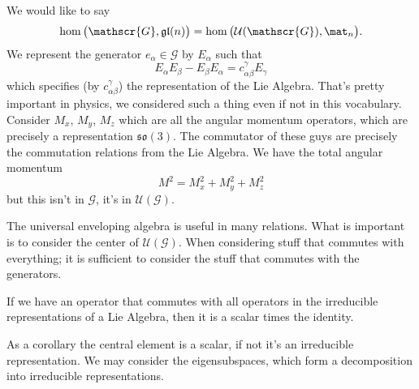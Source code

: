 We would like to say
\begin{equation}
\hom\big(\mathscr{G},\mathfrak{gl}(n)\big)=\hom\big(\mathcal{U}(\mathscr{G}),\mat_{n}\big).
\end{equation}
We represent the generator $e_{\alpha}\in\mathscr{G}$ by
$E_{\alpha}$ such that
\begin{equation}
E_{\alpha}E_{\beta}-E_{\beta}E_{\alpha}=c^{\gamma}_{\alpha\beta}E_{\gamma}
\end{equation}
which specifies (by $c^{\gamma}_{\alpha\beta}$) the
representation of the Lie Algebra. That's pretty important in
physics, we considered such a thing even if not in this
vocabulary. Consider $M_{x}$, $M_{y}$, $M_{z}$ which are all the
angular momentum operators, which are precisely a representation
$\mathfrak{so}(3)$. The commutator of these guys are precisely
the commutation relations from the Lie Algebra. We have the total
angular momentum
\begin{equation}
M^{2}=M_{x}^{2}+M_{y}^{2}+M_{z}^{2}
\end{equation}
but this isn't in $\mathscr{G}$, it's in
$\mathcal{U}(\mathscr{G})$.

The universal enveloping algebra is useful in many
relations. What is important is to consider the center of
$\mathcal{U}(\mathscr{G})$. When considering stuff that commutes
with everything; it is sufficient to consider the stuff that
commutes with the generators.

\begin{schur}
If we have an operator that commutes with all operators in the
irreducible representations of a Lie Algebra, then it is a scalar
times the identity.
\end{schur}

As a corollary the central element is a scalar, if not it's an
irreducible representation. We may consider the eigensubspaces,
which form a decomposition into irreducible representations.


